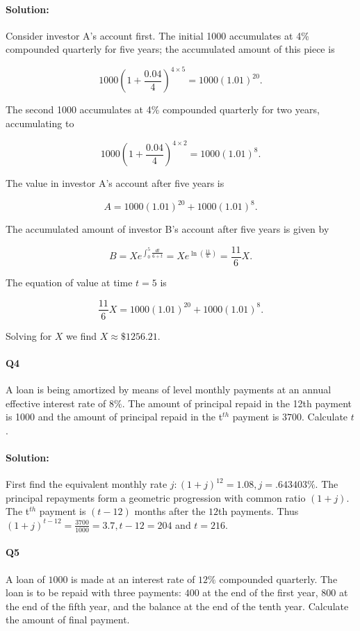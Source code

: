 \documentclass[a4paper, 11pt, twoside]{article}
\begin{document}
\paragraph{Solution:} Consider investor A's account first. The initial 1000 accumulates at 4\% compounded quarterly for five years; the accumulated amount of this piece is

\[1000\left(1+\frac{0.04}{4}\right)^{4\times5}=1000(1.01)^{20}.\]

The second 1000 accumulates at 4\% compounded quarterly for two years, accumulating to

\[1000\left(1+\frac{0.04}{4}\right)^{4\times2} =1000(1.01)^8.\]

The value in investor A's account after five years is

\[A=1000(1.01)^{20}+1000(1.01)^8.\]

The accumulated amount of investor B's account after five years is given by

\[B=Xe^{\int^5_0\frac{dt}{6+t}}=Xe^{\ln\left(\frac{11}{6}\right)}=\frac{11}{6}X.\]

The equation of value at time $t=5$ is

\[\frac{11}{6}X=1000(1.01)^{20}+1000(1.01)^8.\]

Solving for $X$ we find $X\approx\$1256.21.$

\paragraph{Q4} A loan is being amortized by means of level monthly payments at an annual effective interest rate of $8\%$. The amount of principal repaid in the 12th payment is 1000 and the amount of principal repaid in the t$^{th}$ payment is $3700$. Calculate $t$.

\paragraph{Solution:} First find the equivalent monthly rate $j:(1+j)^{12}=1.08, j=.643403\%$. The principal repayments form a geometric progression with common ratio $(1+j)$. The t$^{th}$ payment is $(t-12)$ months after the $12$th payments. Thus $(1+j)^{t-12}=\frac{3700}{1000}=3.7, t-12=204$ and $t=216$.

\paragraph{Q5} A loan of $1000$ is made at an interest rate of $12\%$ compounded quarterly. The loan is to be repaid with three payments: $400$ at the end of the first year, $800$ at the end of the fifth year, and the balance at the end of the tenth year. Calculate the amount of final payment.
\end{document}
